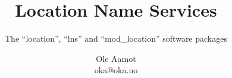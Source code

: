 \documentclass{article}
\begin{document}
\title{Location Name Services}
\subtitle{The ``location'', ``lns'' and ``mod_location'' software packages}
\author{Ole Aamot\\ oka@oka.no}
\maketitle
\end{document}
